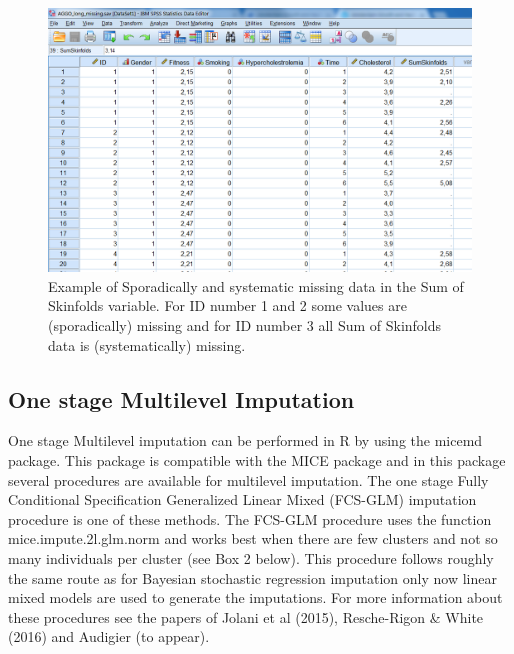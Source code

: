 \documentclass[]{book}
\theoremstyle{definition}
\theoremstyle{definition}
\theoremstyle{definition}
\theoremstyle{remark}
\begin{document}
\begin{figure}

{\centering \includegraphics[width=0.9\linewidth]{images/fig7.15} 

}

\caption{Example of Sporadically and systematic missing data in the Sum of Skinfolds variable. For ID number 1 and 2 some values are (sporadically) missing and for ID number 3 all Sum of Skinfolds data is (systematically) missing.}\label{fig:fig86}
\end{figure}

\subsection{One stage Multilevel
Imputation}\label{one-stage-multilevel-imputation-1}

One stage Multilevel imputation can be performed in R by using the
micemd package. This package is compatible with the MICE package and in
this package several procedures are available for multilevel imputation.
The one stage Fully Conditional Specification Generalized Linear Mixed
(FCS-GLM) imputation procedure is one of these methods. The FCS-GLM
procedure uses the function mice.impute.2l.glm.norm and works best when
there are few clusters and not so many individuals per cluster (see Box
2 below). This procedure follows roughly the same route as for Bayesian
stochastic regression imputation only now linear mixed models are used
to generate the imputations. For more information about these procedures
see the papers of Jolani et al (2015), Resche-Rigon \& White (2016) and
Audigier (to appear).
\end{document}
